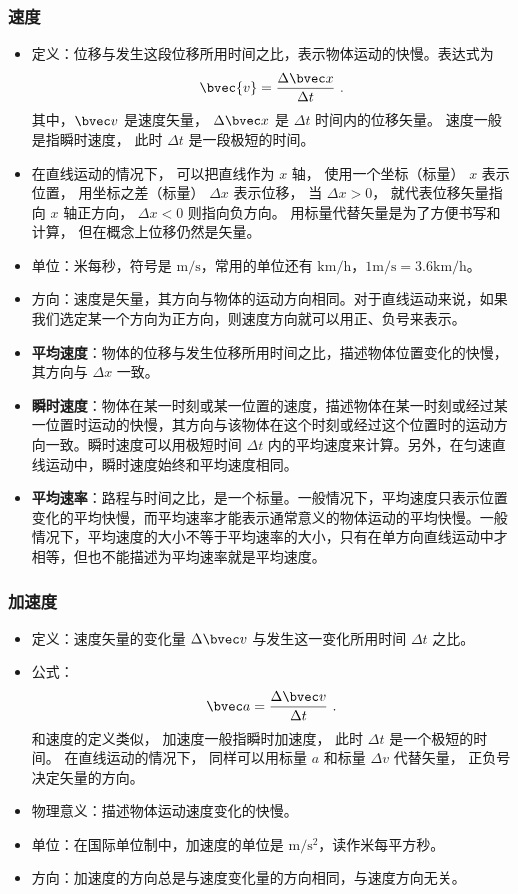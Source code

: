 \subsubsection{速度}
\begin{itemize}
\item 定义：位移与发生这段位移所用时间之比，表示物体运动的快慢。表达式为
\begin{equation}\label{eq_HSPM01_3}
\bvec{v} = \frac{\Delta \bvec x}{\Delta t}~.
\end{equation}
其中，$\bvec v$ 是速度矢量， $\Delta \bvec x$ 是 $\Delta t$ 时间内的位移矢量。 速度一般是指瞬时速度， 此时 $\Delta t$ 是一段极短的时间。
\item 在直线运动的情况下， 可以把直线作为 $x$ 轴， 使用一个坐标（标量） $x$ 表示位置， 用坐标之差（标量） $\Delta x$ 表示位移， 当 $\Delta x > 0$， 就代表位移矢量指向 $x$ 轴正方向， $\Delta x < 0$ 则指向负方向。 用标量代替矢量是为了方便书写和计算， 但在概念上位移仍然是矢量。
\item 单位：米每秒，符号是 $\mathrm{m/s}$，常用的单位还有 $\mathrm{km/h}$，$1\mathrm{m/s}=3.6\mathrm{km/h}$。
\item 方向：速度是矢量，其方向与物体的运动方向相同。对于直线运动来说，如果我们选定某一个方向为正方向，则速度方向就可以用正、负号来表示。
\item \textbf{平均速度}：物体的位移与发生位移所用时间之比，描述物体位置变化的快慢，其方向与 $\Delta x$ 一致。
\item \textbf{瞬时速度}：物体在某一时刻或某一位置的速度，描述物体在某一时刻或经过某一位置时运动的快慢，其方向与该物体在这个时刻或经过这个位置时的运动方向一致。瞬时速度可以用极短时间 $\Delta t$ 内的平均速度来计算。另外，在匀速直线运动中，瞬时速度始终和平均速度相同。
\item \textbf{平均速率}：路程与时间之比，是一个标量。一般情况下，平均速度只表示位置变化的平均快慢，而平均速率才能表示通常意义的物体运动的平均快慢。一般情况下，平均速度的大小不等于平均速率的大小，只有在单方向直线运动中才相等，但也不能描述为平均速率就是平均速度。
\end{itemize}

\subsubsection{加速度}
\begin{itemize}
\item 定义：速度矢量的变化量 $\Delta \bvec v$ 与发生这一变化所用时间 $\Delta t$ 之比。
\item 公式：
\begin{equation}
\bvec a=\frac{\Delta \bvec v}{\Delta t}~.
\end{equation}
和速度的定义类似， 加速度一般指瞬时加速度， 此时 $\Delta t$ 是一个极短的时间。 在直线运动的情况下， 同样可以用标量 $a$ 和标量 $\Delta v$ 代替矢量， 正负号决定矢量的方向。
\item 物理意义：描述物体运动速度变化的快慢。
\item 单位：在国际单位制中，加速度的单位是 $\mathrm{m/s^2}$，读作米每平方秒。
\item 方向：加速度的方向总是与速度变化量的方向相同，与速度方向无关。
\end{itemize}

